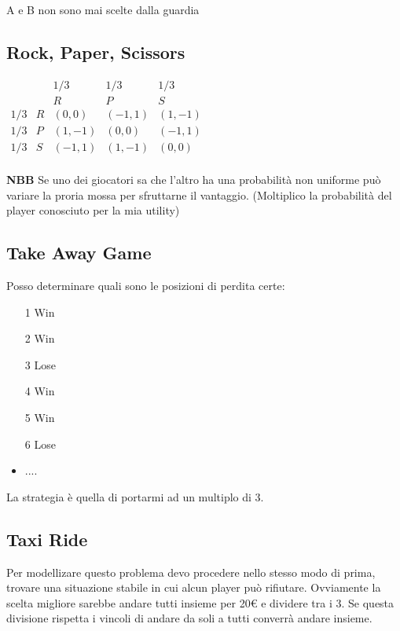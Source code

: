 \documentclass[10pt,a4paper]{report}
\begin{document}
        A e B non sono mai scelte dalla guardia

        \subsection{Rock, Paper, Scissors}
        $
        \begin{matrix}
              &        &   1/3  &   1/3  &   1/3  \\
              &        &     R  &     P  &     S  \\
         1/3  &      R & (0,0)  & (-1,1) & (1,-1) \\
         1/3  &      P & (1,-1) & (0,0)  & (-1,1) \\
         1/3  &      S & (-1,1) & (1,-1) & (0,0)  \\
        \end{matrix}
        $

        \textbf{NBB} Se uno dei giocatori sa che l'altro ha una probabilità non uniforme può variare la proria mossa per sfruttarne il vantaggio. (Moltiplico la probabilità del player conosciuto per la mia utility)

        \subsection{Take Away Game}
        Posso determinare quali sono le posizioni di perdita certe:
        \begin{itemize}
            \item [1] Win
            \item [2] Win
            \item [3] Lose
            \item [4] Win
            \item [5] Win
            \item [6] Lose
            \item ....
        \end{itemize}
        La strategia è quella di portarmi ad un multiplo di 3.

        \subsection{Taxi Ride}
        Per modellizare questo problema devo procedere nello stesso modo di prima, trovare una situazione stabile in cui alcun player può rifiutare.
        Ovviamente la scelta migliore sarebbe andare tutti insieme per 20€ e dividere tra i 3. Se questa divisione rispetta i vincoli di andare da soli a tutti converrà andare insieme.
\end{document}
